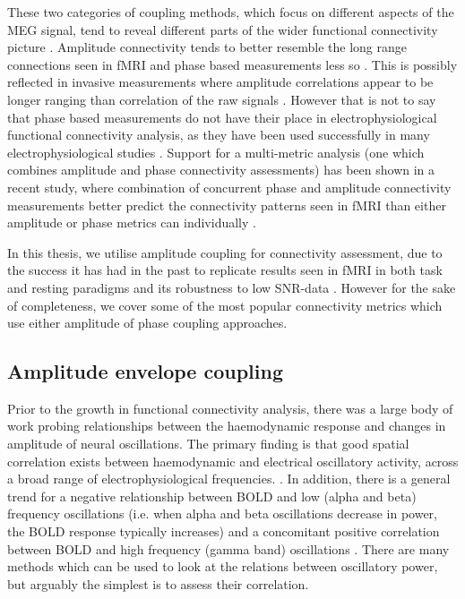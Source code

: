 These two categories of coupling methods, which focus on different aspects of the MEG signal, tend to reveal different parts of the wider functional connectivity picture \citep{Scholvinck2013}. Amplitude connectivity tends to better resemble the long range connections seen in fMRI and phase based measurements less so \citep{Brookes2011a,Tewarie2016}. This is possibly reflected in invasive measurements where amplitude correlations appear to be longer ranging than correlation of the raw signals \citep{Leopold2003}. However that is not to say that phase based measurements do not have their place in electrophysiological functional connectivity analysis, as they have been used successfully in many electrophysiological studies \citep{Gross2001,Nolte2004,Jerbi2007,Kujala2007,Guggisberg2008,Hillebrand2012,Marzetti2013}. Support for a multi-metric analysis (one which combines amplitude and phase connectivity assessments) has been shown in a recent study, where combination of concurrent phase and amplitude connectivity measurements better predict the connectivity patterns seen in fMRI than either amplitude or phase metrics can individually \citep{Tewarie2016}. 

In this thesis, we utilise amplitude coupling for connectivity assessment, due to the success it has had in the past to replicate results seen in fMRI in both task and resting paradigms and its robustness to low SNR-data \citep{Colclough2016}. However for the sake of completeness, we cover some of the most popular connectivity metrics which use either amplitude of phase coupling approaches. 

\subsection{Amplitude envelope coupling}\label{sec_3_hilbert}

Prior to the growth in functional connectivity analysis, there was a large body of work probing relationships between the haemodynamic response and changes in amplitude of neural oscillations. The primary finding is that good spatial correlation exists between haemodynamic and electrical oscillatory activity, across a broad range of electrophysiological frequencies. \citep{Logothetis2001,Singh2002,Moradi2003,Brookes2005,Mukamel2005,Winterer2007,Muthukumaraswamy2008,Zumer2010,Stevenson2011,Stevenson2012}. In addition, there is a general trend for a negative relationship between BOLD and low (alpha and beta) frequency oscillations (i.e. when alpha and beta oscillations decrease in power, the BOLD response typically increases) and a concomitant positive correlation between BOLD and high frequency (gamma band) oscillations \citep{Hall2014}. There are many methods which can be used to look at the relations between oscillatory power, but arguably the simplest is to assess their correlation. 

